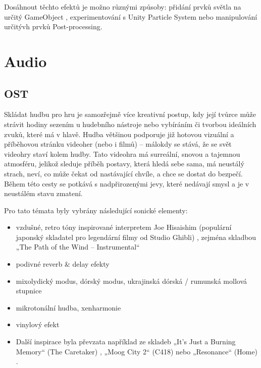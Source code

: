 Dosáhnout těchto efektů je možno různými způsoby: přidání prvků světla na určitý GameObject \cite{unity-point-light}, experimentování s Unity Particle System \cite{unity-particle-system} nebo manipulování určitývh prvků Post-processing.

\newpage

\section{Audio}

\subsection{OST}

Skládat hudbu pro hru je samozřejmě více kreativní postup, kdy její tvůrce může strávit hodiny sezením u hudebního nástroje nebo vybíráním či tvorbou ideálních zvuků, které má v hlavě. Hudba většinou podporuje již hotovou vizuální a příběhovou stránku videoher (nebo i filmů) -- málokdy se stává, že se svět videohry staví kolem hudby. Tato videohra má surreální, snovou a tajemnou atmosféru, jelikož sleduje příběh postavy, která hledá sebe sama, má neustálý strach, neví, co může čekat od nastávající chvíle, a chce se dostat do bezpečí. Během této cesty se potkává s nadpřirozenými jevy, které nedávají smysl a je v neustálém stavu zmatení.

Pro tato témata byly vybrány následující sonické elementy:

\begin{itemize}
    \item vzdušné, retro tóny inspirované interpretem Joe Hisaishim (populární japonský skladatel pro legendární filmy od Studio Ghibli) \cite{ghibli}, zejména skladbou „The Path of the Wind – Instrumental“\cite{hisaishi-path-wind}
    \item podivné reverb \& delay efekty
    \item mixolydický modus, dórský modus, ukrajinská dórská / rumunská mollová stupnice
    \item mikrotonální hudba, xenharmonie
    \item vinylový efekt
    \item Další inspirace byla převzata například ze skladeb „It’s Just a Burning Memory“ (The Caretaker) \cite{caretaker-burning-memory}, „Moog City 2“ (C418) \cite{c418-moog-city-2} nebo „Resonance“ (Home) \cite{home-resonance}.
\end{itemize}

